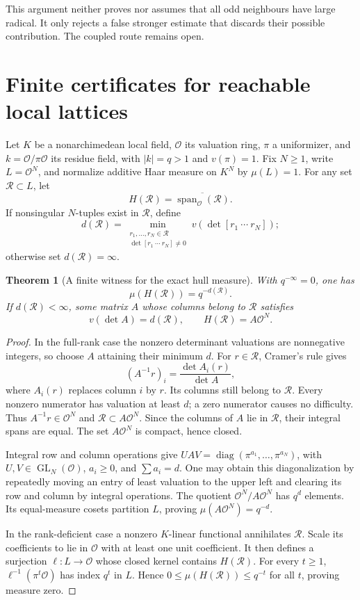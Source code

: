 \documentclass[11pt]{amsart}
\newtheorem{theorem}{Theorem}[section]
\theoremstyle{definition}
\theoremstyle{remark}
\newcommand{\OO}{\mathcal O}
\newcommand{\Span}{\operatorname{span}}
\newcommand{\GL}{\operatorname{GL}}
\begin{document}
This argument neither proves nor assumes that all odd neighbours have large
radical. It only rejects a false stronger estimate that discards their
possible contribution. The coupled route remains open.

\section{Finite certificates for reachable local lattices}\label{sec:lattice}

Let $K$ be a nonarchimedean local field, $\OO$ its valuation ring,
$\pi$ a uniformizer, and $k=\OO/\pi\OO$ its residue field, with
$|k|=q>1$ and $v(\pi)=1$. Fix $N\ge1$, write $L=\OO^N$, and normalize
additive Haar measure on $K^N$ by $\mu(L)=1$.
For any set $\mathcal R\subset L$, let
\[
 H(\mathcal R)=\overline{\Span_{\OO}(\mathcal R)}.
\]
If nonsingular $N$-tuples exist in $\mathcal R$, define
\[
 d(\mathcal R)=\min_{\substack{r_1,\ldots,r_N\in\mathcal R\\
                         \det[r_1\ \cdots\ r_N]\ne0}}
                         v(\det[r_1\ \cdots\ r_N]);
\]
otherwise set $d(\mathcal R)=\infty$.

\begin{theorem}[A finite witness for the exact hull measure]\label{thm:lattice}
With $q^{-\infty}=0$, one has
\[
 \mu(H(\mathcal R))=q^{-d(\mathcal R)}.
\]
If $d(\mathcal R)<\infty$, some matrix $A$ whose columns belong to
$\mathcal R$ satisfies
\[
 v(\det A)=d(\mathcal R),\qquad H(\mathcal R)=A\OO^N.
\]
\end{theorem}
\begin{proof}
In the full-rank case the nonzero determinant valuations are nonnegative
integers, so choose $A$ attaining their minimum $d$.
For $r\in\mathcal R$, Cramer's rule gives
\[
 (A^{-1}r)_i=\frac{\det A_i(r)}{\det A},
\]
where $A_i(r)$ replaces column $i$ by $r$.
Its columns still belong to $\mathcal R$. Every nonzero numerator has
valuation at least $d$; a zero numerator causes no difficulty.
Thus $A^{-1}r\in\OO^N$ and $\mathcal R\subset A\OO^N$.
Since the columns of $A$ lie in $\mathcal R$, their integral spans are equal.
The set $A\OO^N$ is compact, hence closed.

Integral row and column operations give
$UAV=\operatorname{diag}(\pi^{a_1},\ldots,\pi^{a_N})$, with
$U,V\in\GL_N(\OO)$, $a_i\ge0$, and $\sum a_i=d$.
One may obtain this diagonalization by repeatedly moving an entry of least
valuation to the upper left and clearing its row and column by integral
operations. The quotient $\OO^N/A\OO^N$ has $q^d$ elements.
Its equal-measure cosets partition $L$, proving $\mu(A\OO^N)=q^{-d}$.

In the rank-deficient case a nonzero $K$-linear functional annihilates
$\mathcal R$. Scale its coefficients to lie in $\OO$ with at least one
unit coefficient. It then defines a surjection $\ell:L\to\OO$ whose
closed kernel contains $H(\mathcal R)$. For every $t\ge1$,
$\ell^{-1}(\pi^t\OO)$ has index $q^t$ in $L$. Hence
$0\le\mu(H(\mathcal R))\le q^{-t}$ for all $t$, proving measure zero.
\end{proof}
\end{document}
